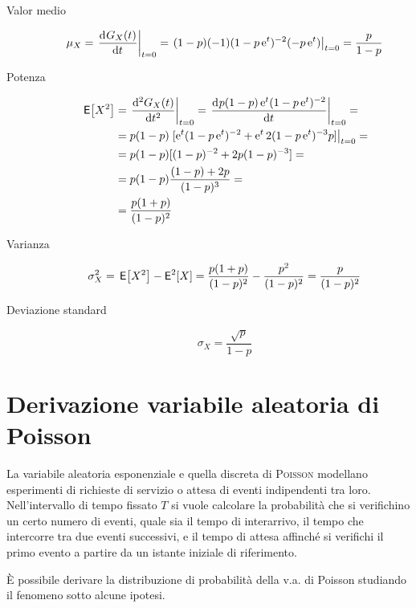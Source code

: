 \begin{description}
\item[Valor medio]
\begin{equation}
	\mu_X=\restrict{\deriv{G_X(t)}{t}}{t=0}=\restrict{(1-p)(-1)(1-p\e{t})^{-2}(-p\e{t})}{t=0}=\frac{p}{1-p}
\end{equation}
\item[Potenza]
\begin{equation}
\begin{split}
	\E{X^2}&=\restrict{\deriv[2]{G_X(t)}{t}}{t=0}=\restrict{\deriv{p(1-p)\e{t}(1-p\e{t})^{-2}}{t}}{t=0}=\\
	&=p(1-p)\restrict{[\e{t}(1-p\e{t})^{-2}+\e{t}2(1-p\e{t})^{-3}p]}{t=0}=\\
	&=p(1-p)[(1-p)^{-2}+2p(1-p)^{-3}]=\\
	&=p(1-p)\frac{(1-p)+2p}{(1-p)^3}=\\
	&=\frac{p(1+p)}{(1-p)^2}
\end{split}
\end{equation}
\item[Varianza]
\begin{equation}
	\sigma^2_X=\E{X^2}-\Esp^2[X]=\frac{p(1+p)}{(1-p)^2}-\frac{p^2}{(1-p)^2}=\frac{p}{(1-p)^2}
\end{equation}
\item[Deviazione standard]
\begin{equation}
	\sigma_X=\frac{\sqrt{p}}{1-p}
\end{equation}
\end{description}

\section{Derivazione variabile aleatoria di Poisson}
La variabile aleatoria esponenziale e quella discreta di \textsc{Poisson} modellano esperimenti di richieste di servizio o attesa di eventi indipendenti tra loro. Nell'intervallo di tempo fissato $T$ si vuole calcolare la probabilità che si verifichino un certo numero di eventi, quale sia il tempo di interarrivo, il tempo che intercorre tra due eventi successivi, e il tempo di attesa affinché si verifichi il primo evento a partire da un istante iniziale di riferimento.

\`E possibile derivare la distribuzione di probabilità della v.a. di Poisson studiando il fenomeno sotto alcune ipotesi.

